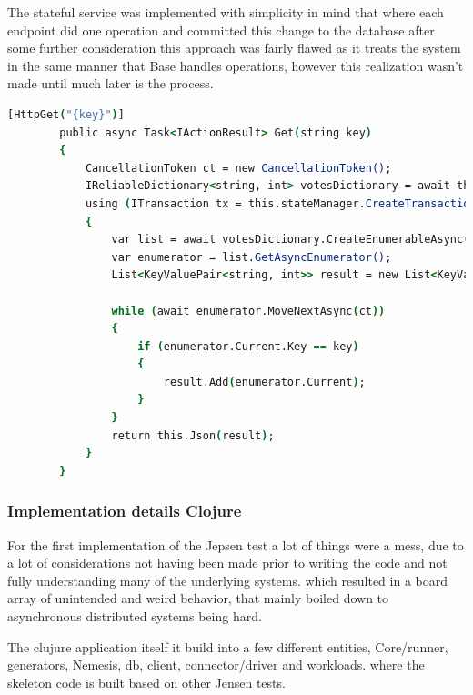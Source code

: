 \documentclass[a4paper,10pt,titlepage]{report}
\begin{document}
The stateful service was implemented with simplicity in mind that where each endpoint did one operation and committed this change to the database after some further consideration this approach was fairly flawed as it treats the system in the same manner that Base handles operations, however this realization wasn't made until much later is the process.

\begin{lstlisting}[language=csh]
        [HttpGet("{key}")]
        public async Task<IActionResult> Get(string key)
        {
            CancellationToken ct = new CancellationToken();
            IReliableDictionary<string, int> votesDictionary = await this.stateManager.GetOrAddAsync<IReliableDictionary<string, int>>("counts");
            using (ITransaction tx = this.stateManager.CreateTransaction())
            {
                var list = await votesDictionary.CreateEnumerableAsync(tx);
                var enumerator = list.GetAsyncEnumerator();
                List<KeyValuePair<string, int>> result = new List<KeyValuePair<string, int>>();

                while (await enumerator.MoveNextAsync(ct))
                {
                    if (enumerator.Current.Key == key)
                    {
                        result.Add(enumerator.Current);
                    }
                }
                return this.Json(result);
            }
        }
\end{lstlisting}   

    \subsubsection{Implementation details Clojure}
        For the first implementation of the Jepsen test a lot of things were a mess, due to a lot of considerations not having been made prior to writing the code and not fully understanding many of the underlying systems. which resulted in a board array of unintended and weird behavior, that mainly boiled down to asynchronous distributed systems being hard. 
        
        
        The clujure application itself it build into a few different entities, Core/runner, generators, Nemesis, db, client, connector/driver and workloads. where the skeleton code is built based on other Jensen tests.
        
\end{document}
